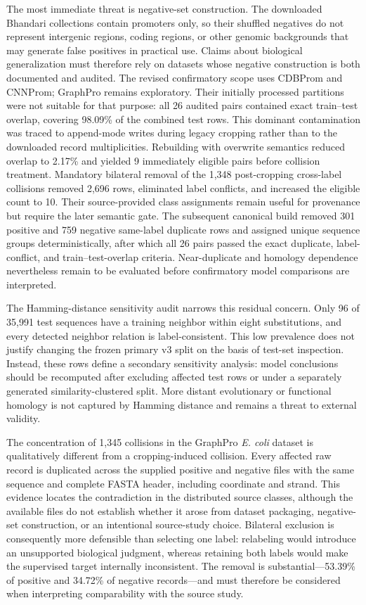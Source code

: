 The most immediate threat is negative-set construction. The downloaded
Bhandari collections contain promoters only, so their shuffled negatives do not
represent intergenic regions, coding regions, or other genomic backgrounds that
may generate false positives in practical use. Claims about biological
generalization must therefore rely on datasets whose negative construction is
both documented and audited. The revised confirmatory scope uses CDBProm and
CNNProm; GraphPro remains exploratory. Their initially processed
partitions were not suitable for that purpose: all 26 audited pairs contained
exact train--test overlap, covering 98.09\% of the combined test rows. This
dominant contamination was traced to append-mode writes during
legacy cropping rather than to the downloaded record multiplicities. Rebuilding
with overwrite semantics reduced overlap to 2.17\% and yielded 9 immediately
eligible pairs before collision treatment. Mandatory bilateral removal of the
1,348 post-cropping cross-label collisions removed 2,696 rows, eliminated label
conflicts, and increased the eligible count to 10. Their source-provided class
assignments remain useful for provenance but require the later semantic gate.
The subsequent canonical build removed 301
positive and 759 negative same-label duplicate rows and assigned unique
sequence groups deterministically, after which all 26 pairs passed the exact
duplicate, label-conflict, and train--test-overlap criteria. Near-duplicate and
homology dependence nevertheless remain to be evaluated before confirmatory
model comparisons are interpreted.

The Hamming-distance sensitivity audit narrows this residual concern. Only 96
of 35,991 test sequences have a training neighbor within eight substitutions,
and every detected neighbor relation is label-consistent. This low prevalence
does not justify changing the frozen primary v3 split on the basis of test-set
inspection. Instead, these rows define a secondary sensitivity analysis: model
conclusions should be recomputed after excluding affected test rows or under a
separately generated similarity-clustered split. More distant evolutionary or
functional homology is not captured by Hamming distance and remains a threat to
external validity.

The concentration of 1,345 collisions in the GraphPro \textit{E. coli}
dataset is qualitatively different from a cropping-induced collision. Every
affected raw record is duplicated across the supplied positive and negative
files with the same sequence and complete FASTA header, including coordinate
and strand. This evidence locates the contradiction in the distributed source
classes, although the available files do not establish whether it arose from
dataset packaging, negative-set construction, or an intentional source-study
choice. Bilateral exclusion is consequently more defensible than selecting one
label: relabeling would introduce an unsupported biological judgment, whereas
retaining both labels would make the supervised target internally inconsistent.
The removal is substantial---53.39\% of positive and 34.72\% of negative
records---and must therefore be considered when interpreting comparability with
the source study.


